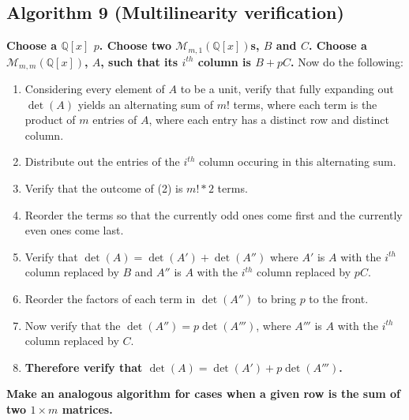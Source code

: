 \documentclass[twocolumn]{article}
\begin{document}
		\subsection{Algorithm 9 (Multilinearity verification)}\label{sec:algorithm 9}
			\textbf{Choose a $\mathbb{Q}[x]$ $p$. Choose two $\mathcal{M}_{m,1}(\mathbb{Q}[x])$s, $B$ and $C$. Choose a $\mathcal{M}_{m,m}(\mathbb{Q}[x])$, $A$, such that its $i^{th}$ column is $B+pC$.} Now do the following:
			\begin{enumerate}
				\item Considering every element of $A$ to be a unit, verify that fully expanding out $\det(A)$ yields an alternating sum of $m!$ terms, where each term is the product of $m$ entries of $A$, where each entry has a distinct row and distinct column.
				\item Distribute out the entries of the $i^{th}$ column occuring in this alternating sum.
				\item Verify that the outcome of (2) is $m!*2$ terms.
				\item Reorder the terms so that the currently odd ones come first and the currently even ones come last.
				\item Verify that $\det(A)=\det(A') + \det(A'')$ where $A'$ is $A$ with the $i^{th}$ column replaced by $B$ and $A''$ is $A$ with the $i^{th}$ column replaced by $pC$.
				\item Reorder the factors of each term in $\det(A'')$ to bring $p$ to the front.
				\item Now verify that the $\det(A'')=p\det(A''')$, where $A'''$ is $A$ with the $i^{th}$ column replaced by $C$.
				\item \textbf{Therefore verify that $\det(A)=\det(A') + p\det(A''')$.}
			\end{enumerate}
			\textbf{Make an analogous algorithm for cases when a given row is the sum of two $1\times m$ matrices.}
\end{document}
